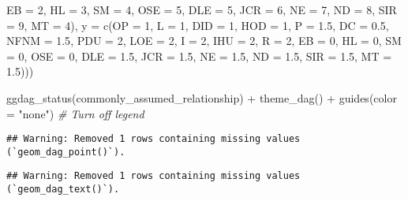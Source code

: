 \documentclass[
]{article}
\newenvironment{Shaded}{\begin{snugshade}}{\end{snugshade}}
\newcommand{\AttributeTok}[1]{\textcolor[rgb]{0.77,0.63,0.00}{#1}}
\newcommand{\CommentTok}[1]{\textcolor[rgb]{0.56,0.35,0.01}{\textit{#1}}}
\newcommand{\DecValTok}[1]{\textcolor[rgb]{0.00,0.00,0.81}{#1}}
\newcommand{\FloatTok}[1]{\textcolor[rgb]{0.00,0.00,0.81}{#1}}
\newcommand{\FunctionTok}[1]{\textcolor[rgb]{0.00,0.00,0.00}{#1}}
\newcommand{\NormalTok}[1]{#1}
\newcommand{\SpecialCharTok}[1]{\textcolor[rgb]{0.00,0.00,0.00}{#1}}
\newcommand{\StringTok}[1]{\textcolor[rgb]{0.31,0.60,0.02}{#1}}
\begin{document}
\begin{Shaded}
\begin{Highlighting}[]
                                            \AttributeTok{EB =} \DecValTok{2}\NormalTok{, }\AttributeTok{HL =} \DecValTok{3}\NormalTok{,  }\AttributeTok{SM =} \DecValTok{4}\NormalTok{, }\AttributeTok{OSE =} \DecValTok{5}\NormalTok{,}
                                            \AttributeTok{DLE =} \DecValTok{5}\NormalTok{, }\AttributeTok{JCR =} \DecValTok{6}\NormalTok{, }\AttributeTok{NE =} \DecValTok{7}\NormalTok{, }\AttributeTok{ND =} \DecValTok{8}\NormalTok{, }\AttributeTok{SIR =} \DecValTok{9}\NormalTok{, }\AttributeTok{MT =} \DecValTok{4}\NormalTok{),}
                                      \AttributeTok{y =} \FunctionTok{c}\NormalTok{(}\AttributeTok{OP =} \DecValTok{1}\NormalTok{, }\AttributeTok{L =} \DecValTok{1}\NormalTok{, }\AttributeTok{DID =} \DecValTok{1}\NormalTok{, }\AttributeTok{HOD =} \DecValTok{1}\NormalTok{, }\AttributeTok{P =} \FloatTok{1.5}\NormalTok{, }\AttributeTok{DC =} \FloatTok{0.5}\NormalTok{, }\AttributeTok{NFNM =} \FloatTok{1.5}\NormalTok{, }\AttributeTok{PDU =} \DecValTok{2}\NormalTok{, }\AttributeTok{LOE =} \DecValTok{2}\NormalTok{, }\AttributeTok{I =} \DecValTok{2}\NormalTok{, }\AttributeTok{IHU =} \DecValTok{2}\NormalTok{, }\AttributeTok{R =} \DecValTok{2}\NormalTok{,}
                                            \AttributeTok{EB =} \DecValTok{0}\NormalTok{, }\AttributeTok{HL =} \DecValTok{0}\NormalTok{,  }\AttributeTok{SM =} \DecValTok{0}\NormalTok{, }\AttributeTok{OSE =} \DecValTok{0}\NormalTok{,}
                                            \AttributeTok{DLE =} \FloatTok{1.5}\NormalTok{, }\AttributeTok{JCR =} \FloatTok{1.5}\NormalTok{, }\AttributeTok{NE =} \FloatTok{1.5}\NormalTok{, }\AttributeTok{ND =} \FloatTok{1.5}\NormalTok{, }\AttributeTok{SIR =} \FloatTok{1.5}\NormalTok{, }\AttributeTok{MT =} \FloatTok{1.5}\NormalTok{)))}

\FunctionTok{ggdag\_status}\NormalTok{(commonly\_assumed\_relationship) }\SpecialCharTok{+}
  \FunctionTok{theme\_dag}\NormalTok{() }\SpecialCharTok{+}
  \FunctionTok{guides}\NormalTok{(}\AttributeTok{color =} \StringTok{"none"}\NormalTok{)  }\CommentTok{\# Turn off legend}
\end{Highlighting}
\end{Shaded}

\begin{verbatim}
## Warning: Removed 1 rows containing missing values (`geom_dag_point()`).
\end{verbatim}

\begin{verbatim}
## Warning: Removed 1 rows containing missing values (`geom_dag_text()`).
\end{verbatim}
\end{document}
